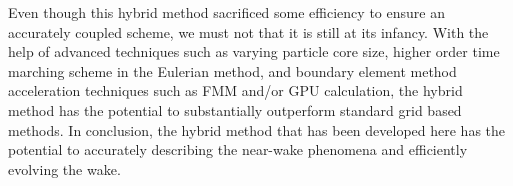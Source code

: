 	Even though this hybrid method sacrificed some efficiency to ensure an accurately coupled scheme, we must not that it is still at its infancy. With the help of advanced techniques such as varying particle core size, higher order time marching scheme in the Eulerian method, and boundary element method acceleration techniques such as FMM and/or GPU calculation, the hybrid method has the potential to substantially outperform standard grid based methods. In conclusion, the hybrid method that has been developed here has the potential to accurately describing the near-wake phenomena and efficiently evolving the wake. 

